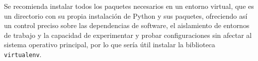 Se recomienda instalar todos los paquetes necesarios en un entorno virtual, que es un directorio con su propia instalación de Python y sus paquetes, ofreciendo así un control preciso sobre las dependencias de software, el aislamiento de entornos de trabajo y la capacidad de experimentar y probar configuraciones sin afectar al sistema operativo principal, por lo que sería útil instalar la biblioteca \texttt{virtualenv}.


